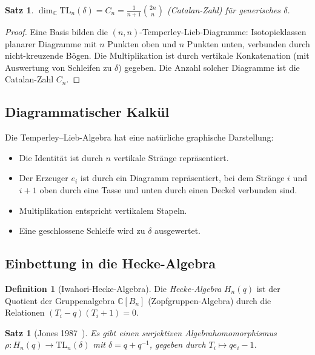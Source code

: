 \documentclass[12pt,a4paper]{amsart}
\newtheorem{satz}[theorem]{Satz}
\theoremstyle{definition}
\newtheorem{definition_de}[theorem]{Definition}
\theoremstyle{remark}
\begin{document}
\begin{satz}
$\dim_\mathbb{C} \mathrm{TL}_n(\delta) = C_n = \frac{1}{n+1}\binom{2n}{n}$
(Catalan-Zahl) für generisches $\delta$.
\end{satz}

\begin{proof}
Eine Basis bilden die $(n,n)$-Temperley-Lieb-Diagramme: Isotopie\-klassen
planarer Diagramme mit $n$ Punkten oben und $n$ Punkten unten, verbunden
durch nicht-kreuzende Bögen. Die Multiplikation ist durch vertikale
Konkatenation (mit Auswertung von Schleifen zu $\delta$) gegeben.
Die Anzahl solcher Diagramme ist die Catalan-Zahl $C_n$.
\end{proof}

\subsection{Diagrammatischer Kalkül}

Die Temperley--Lieb-Algebra hat eine natürliche graphische Darstellung:
\begin{itemize}
\item Die Identität ist durch $n$ vertikale Stränge repräsentiert.
\item Der Erzeuger $e_i$ ist durch ein Diagramm repräsentiert, bei dem
      Stränge $i$ und $i+1$ oben durch eine Tasse und unten durch einen
      Deckel verbunden sind.
\item Multiplikation entspricht vertikalem Stapeln.
\item Eine geschlossene Schleife wird zu $\delta$ ausgewertet.
\end{itemize}

\subsection{Einbettung in die Hecke-Algebra}

\begin{definition_de}[Iwahori-Hecke-Algebra]
Die \emph{Hecke-Algebra} $H_n(q)$ ist der Quotient der Gruppenalgebra
$\mathbb{C}[B_n]$ (Zopfgruppen-Algebra) durch die Relationen
$(T_i - q)(T_i + 1) = 0$.
\end{definition_de}

\begin{satz}[Jones 1987~\cite{Jones1987}]
Es gibt einen surjektiven Algebrahomomorphismus
$\rho \colon H_n(q) \to \mathrm{TL}_n(\delta)$
mit $\delta = q + q^{-1}$, gegeben durch $T_i \mapsto q e_i - 1$.
\end{satz}
\end{document}
